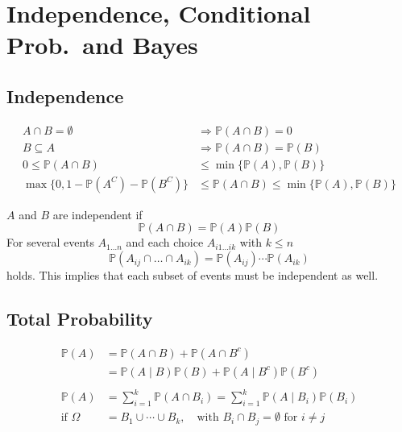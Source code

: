 \section{Independence, Conditional Prob.\ and Bayes}
\subsection{Independence}

\noindent\begin{align*}
    A \cap B = \emptyset                          & \Rightarrow \mathbb{P}(A\cap B) = 0                                 \\
    B \subseteq A                                 & \Rightarrow \mathbb{P}(A\cap B) = \mathbb{P}(B)                     \\
    0 \leq \mathbb{P}(A\cap B)                    & \leq \min\{\mathbb{P}(A), \mathbb{P}(B)\}                           \\
    \max\{0, 1-\mathbb{P}(A^C) -\mathbb{P}(B^C)\} & \leq \mathbb{P}(A\cap B) \leq \min\{ \mathbb{P}(A), \mathbb{P}(B)\}
\end{align*}


$A$ and $B$ are independent if
\noindent\begin{equation*}
    \mathbb{P}(A\cap B) = \mathbb{P}(A)\mathbb{P}(B)
\end{equation*}
For several events $A_{1\dots n}$ and each choice $A_{i1\dots ik}$ with $k\leq n$
\noindent\begin{equation*}
    \mathbb{P}(A_{ij} \cap \dots \cap A_{ik}) = \mathbb{P}(A_{ij}) \cdots \mathbb{P}(A_{ik})
\end{equation*}
holds. This implies that each subset of events must be independent as well.

\subsection{Total Probability}
\noindent\begin{align*}
    \mathbb{P}(A)     & =\mathbb{P}(A\cap B)+\mathbb{P}(A\cap B^c)                                           \\
                      & =\mathbb{P}(A\mid B)\mathbb{P}(B)+\mathbb{P}(A\mid B^c)\mathbb{P}(B^c)               \\\\
    \mathbb{P}(A)     & =\sum_{i=1}^k\mathbb{P}(A\cap B_i) =\sum_{i=1}^k\mathbb{P}(A\mid B_i)\mathbb{P}(B_i) \\
    \text{if } \Omega & =B_1\cup\cdots\cup B_k,\quad\text{with }B_i\cap B_j=\emptyset\text{ for }i\neq j
\end{align*}
